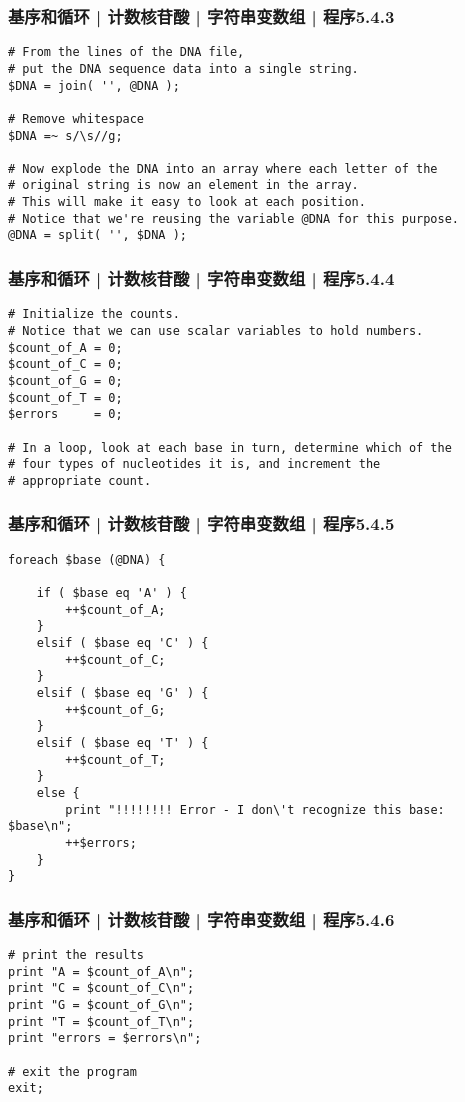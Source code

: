 \begin{frame}[fragile]
  \frametitle{基序和循环 | 计数核苷酸 | 字符串变数组 | 程序5.4.3}
\begin{lstlisting}[firstnumber=26,basicstyle=\small\tt]
# From the lines of the DNA file,
# put the DNA sequence data into a single string.
$DNA = join( '', @DNA );

# Remove whitespace
$DNA =~ s/\s//g;

# Now explode the DNA into an array where each letter of the
# original string is now an element in the array.
# This will make it easy to look at each position.
# Notice that we're reusing the variable @DNA for this purpose.
@DNA = split( '', $DNA );
\end{lstlisting}
\end{frame}

\begin{frame}[fragile]
  \frametitle{基序和循环 | 计数核苷酸 | 字符串变数组 | 程序5.4.4}
\begin{lstlisting}[firstnumber=39]
# Initialize the counts.
# Notice that we can use scalar variables to hold numbers.
$count_of_A = 0;
$count_of_C = 0;
$count_of_G = 0;
$count_of_T = 0;
$errors     = 0;

# In a loop, look at each base in turn, determine which of the
# four types of nucleotides it is, and increment the
# appropriate count.
\end{lstlisting}
\end{frame}

\begin{frame}[fragile]
  \frametitle{基序和循环 | 计数核苷酸 | 字符串变数组 | 程序5.4.5}
\begin{lstlisting}[firstnumber=50,basicstyle=\footnotesize\tt,numberstyle=\scriptsize]
foreach $base (@DNA) {

    if ( $base eq 'A' ) {
        ++$count_of_A;
    }
    elsif ( $base eq 'C' ) {
        ++$count_of_C;
    }
    elsif ( $base eq 'G' ) {
        ++$count_of_G;
    }
    elsif ( $base eq 'T' ) {
        ++$count_of_T;
    }
    else {
        print "!!!!!!!! Error - I don\'t recognize this base: $base\n";
        ++$errors;
    }
}
\end{lstlisting}
\end{frame}

\begin{frame}[fragile]
  \frametitle{基序和循环 | 计数核苷酸 | 字符串变数组 | 程序5.4.6}
\begin{lstlisting}[firstnumber=70]
# print the results
print "A = $count_of_A\n";
print "C = $count_of_C\n";
print "G = $count_of_G\n";
print "T = $count_of_T\n";
print "errors = $errors\n";

# exit the program
exit;
\end{lstlisting}
\end{frame}


